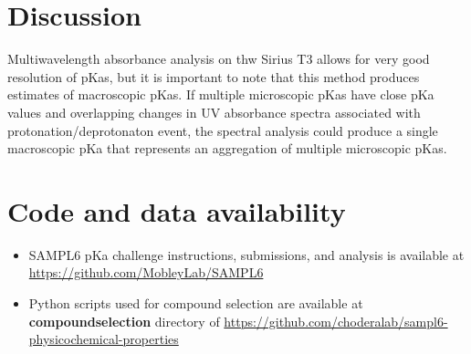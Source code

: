 \documentclass[9pt,lineno]{elife}
\begin{document}

\section{Discussion}
Multiwavelength absorbance analysis on thw Sirius T3 allows for very good resolution of pKas, but it is important to note that this method produces estimates of macroscopic pKas. If multiple microscopic pKas have close pKa values and overlapping changes in UV absorbance spectra associated with protonation/deprotonaton event, the spectral analysis could produce a single macroscopic pKa that represents an aggregation of multiple microscopic pKas.

\section{Code and data availability}
\begin{minipage}{15cm}
\begin{itemize}

\item SAMPL6 pKa challenge instructions, submissions, and analysis is available at  \href{https://github.com/MobleyLab/SAMPL6}{https://github.com/MobleyLab/SAMPL6}

\item Python scripts used for compound selection are available at \textbf{compound\textunderscore selection} directory of  
\href{https://github.com/choderalab/sampl6\textendash physicochemical\textendash properties}{https://github.com/choderalab/sampl6-physicochemical-properties}

\end{itemize}
\end{minipage}
\end{document}
